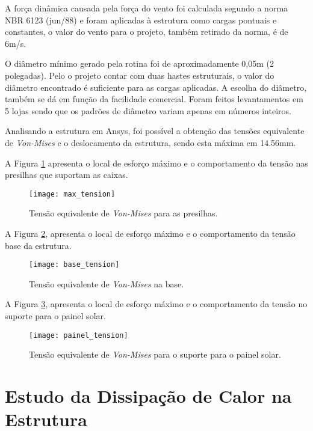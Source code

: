 A força dinâmica causada pela força do vento foi calculada segundo a norma NBR 6123 (jun/88) \cite{vento} e foram aplicadas à estrutura como cargas pontuais e constantes, o valor do vento para o projeto, também retirado da norma, é de 6m/s.	

O diâmetro mínimo gerado pela rotina foi de aproximadamente 0,05m (2 polegadas). Pelo o projeto contar com duas hastes estruturais, o valor do diâmetro encontrado é suficiente para as cargas aplicadas. A escolha do diâmetro, também se dá em função da facilidade comercial. Foram feitos levantamentos em 5 lojas sendo que os padrões de diâmetro variam apenas em números inteiros.

Analisando a estrutura em Ansys, foi possível a obtenção das tensões equivalente de \textit{Von-Mises} e o deslocamento da estrutura, sendo esta máxima em 14.56mm.

A Figura \ref{fig:maximo} apresenta o local de esforço máximo e o comportamento da tensão nas presilhas que suportam as caixas.
\newpage
\begin{figure}[h]
	\centering
    \texttt{[image: max\_tension]}
    \caption{Tensão equivalente de \textit{Von-Mises} para as presilhas.}
    \label{fig:maximo}
\end{figure}

A Figura \ref{fig:base}, apresenta o local de esforço máximo e o comportamento da tensão base da estrutura.

\begin{figure}[h]
	\centering
    \texttt{[image: base\_tension]}
    \caption{Tensão equivalente de \textit{Von-Mises} na base.}
    \label{fig:base}
\end{figure}

A Figura \ref{fig:painel}, apresenta o local de esforço máximo e o comportamento da tensão no suporte para o painel solar.
\newpage
\begin{figure}[h]
	\centering
    \texttt{[image: painel\_tension]}
    \caption{Tensão equivalente de \textit{Von-Mises} para o suporte para o painel solar.}
    \label{fig:painel}
\end{figure}


\section{Estudo da Dissipação de Calor na Estrutura}

